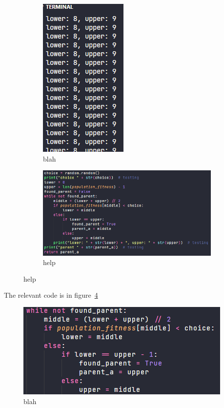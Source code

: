 \documentclass[a4paper, 12pt]{report}
\begin{document}
\begin{figure}[ht]
	\centering
	\begin{subfigure}{0.2\textwidth}
	\includegraphics{images/binary-search-2}
	\caption{blah} %
	\label{fig:terminal-output-1}
	\end{subfigure}
	\begin{subfigure}{0.7\textwidth}
	\includegraphics{images/binary-search-1}
	\caption{help} %
	\label{fig:code-1}
	\end{subfigure}
\end{figure}  %

The relevant code is in figure~\ref*{fig:code-2}

\begin{figure}[ht]
	\centering
	\includegraphics{images/binary-search-3}
	\caption{blah}  %
	\label{fig:code-2}
\end{figure}
\end{document}
